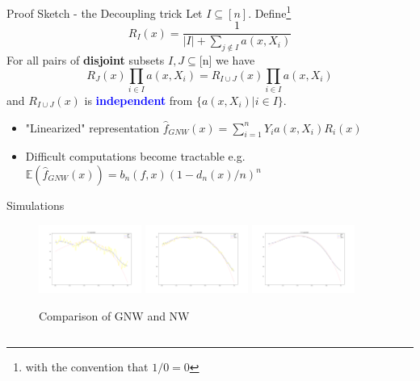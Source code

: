 \documentclass[final,dvipsnames]{beamer}
\newcommand{\myemphh}[1]{\textbf{\textcolor{blue}{#1}}}
\begin{document}
\begin{frame}
\begin{columns}[T]
\begin{column}{.6\textwidth}
\begin{block}{Proof Sketch - the Decoupling trick}
Let $I\subseteq [n]$. Define\footnote{with the convention that $1/0=0$}  
\begin{equation*}
    R_I(x)=
    \frac{1}{|I|+\sum_{j\notin I}a(x,X_i)}
\end{equation*}
For all pairs of \textbf{disjoint} subsets $I,J\subseteq$[n] we have
\begin{equation*}
R_J(x)\prod_{i\in I}a(x,X_i)=R_{I\cup J}(x)\prod_{i\in I}a(x,X_i)
\end{equation*}
and $R_{I\cup J}(x)$ is \myemphh{independent} from $\{a(x,X_i)|i\in I\}$.
\vspace{20pt}
\begin{itemize}
    \item "Linearized" representation 
 $\hat{f}_{GNW}(x)=\sum_{i=1}^nY_ia(x,X_i)R_i(x)$
\item Difficult computations become tractable e.g. $\mathbb{E}(\hat{f}_{GNW}(x))=b_n(f,x)(1-d_n(x)/n)^n$  
\end{itemize}
\end{block}
\begin{block}{Simulations}
\begin{figure}
    \centering
    \includegraphics[width=0.3\textwidth]{SSLAN_f_3_gaussian.png}
    \includegraphics[width=0.3\textwidth]{MSMN_f_3_gaussian.png}
    \includegraphics[width=0.3\textwidth]{LSLN_f_3_gaussian.png}
    \caption{Comparison of GNW and NW}
    \label{fig:simulations}
\end{figure}
\end{block}
\end{column}
\end{columns}
\end{frame}
\end{document}

